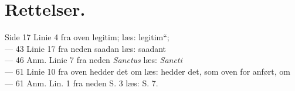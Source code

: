 \documentclass[12pt]{book}
\begin{document}
\section*{Rettelser.}
\noindent
Side 17 Linie 4 fra oven legitim; læs: legitim“;\\
--- 43 Linie 17 fra neden saadan læs: saadant\\
--- 46 Anm. Linie 7 fra neden \textit{Sanctus} læs: \textit{Sancti}\\
--- 61 Linie 10 fra oven hedder det om læs: hedder det, som oven\-%
for anført, om\\
--- 61 Anm. Lin. 1 fra neden S. 3 læs: S. 7.
\end{document}
